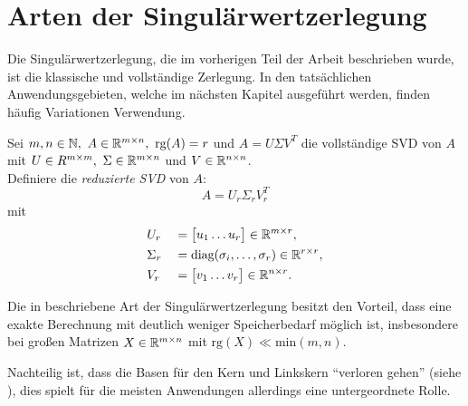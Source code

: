 \section{Arten der Singulärwertzerlegung}

Die Singulärwertzerlegung, die im vorherigen Teil der Arbeit beschrieben wurde, ist die klassische und vollständige Zerlegung.
In den tatsächlichen Anwendungsgebieten, welche im nächsten Kapitel ausgeführt werden, finden häufig Variationen Verwendung.
\begin{definition}\label{df:redsvd}
    Sei \(m,n \in \N,\ A \in \R^{m \times n},\ \text{rg}(A)=r\) und \(A=U \Sigma V^{T}\) die vollständige SVD von \(A\) mit \(U \in R^{m \times m},\ \Sigma \in \mathbb{R}^{m \times n}\) und \(V \in \mathbb{R}^{n \times n}\). \\
    Definiere die \textit{reduzierte SVD} von \(A\):
    \begin{equation*}
        A = U_r \Sigma_r V^{T}_r
    \end{equation*}
    mit
    \begin{alignat*}{2}
        &U_r &{}={}&
        \big[
        \begin{matrix}
            u_1 \dots u_{r}
        \end{matrix}
        \big]
        \in \mathbb{R}^{m \times r}, \\
        &\Sigma_r &{}={}&
        \text{diag}(\sigma_i,\ldots,\sigma_r)
        \in \mathbb{R}^{r \times r}, \\
        &V_r &{}={}&
        \big[
        \begin{matrix}
            v_1 \dots v_{r}
        \end{matrix}
        \big]
        \in \mathbb{R}^{n \times r}.
    \end{alignat*}
\end{definition}
Die in  beschriebene Art der Singulärwertzerlegung besitzt den Vorteil, dass eine exakte Berechnung mit deutlich weniger Speicherbedarf möglich ist, insbesondere bei großen Matrizen \(X \in \mathbb{R}^{m \times n}\) mit \(\text{rg}(X) \ll \text{min}(m,n)\). 

Nachteilig ist, dass die Basen für den Kern und Linkskern \enquote{verloren gehen} (siehe ), dies spielt für die meisten Anwendungen allerdings eine untergeordnete Rolle.

